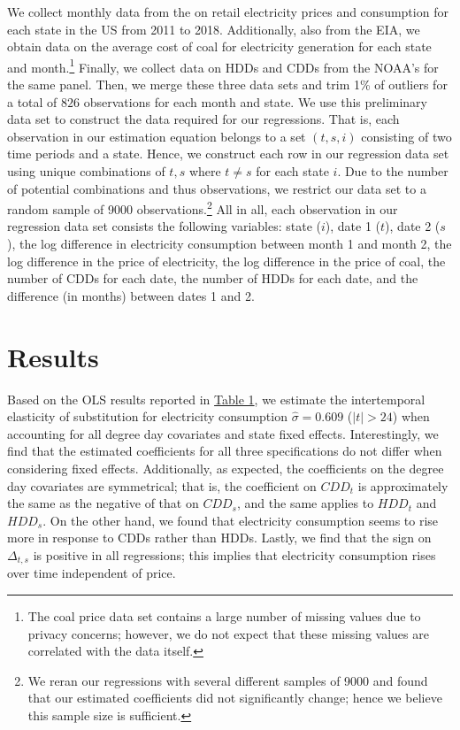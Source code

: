 \documentclass[11pt,a4paper]{extarticle}
\begin{document}
We collect monthly data from the \cite{EIANetgen} on retail electricity prices and consumption for each state in the US from 2011 to 2018. Additionally, also from the EIA, we obtain data on the average cost of coal for electricity generation for each state and month.\footnote{The coal price data set contains a large number of missing values due to privacy concerns; however, we do not expect that these missing values are correlated with the data itself.} 
Finally, we collect data on HDDs and CDDs from the NOAA's \citet{CPC} for the same panel. Then, we merge these three data sets and trim 1\% of outliers for a total of $826$ observations for each month and state. We use this preliminary data set to construct the data required for our regressions. That is, each observation in our estimation equation belongs to a set $(t,s,i)$ consisting of two time periods and a state. Hence, we construct each row in our regression data set using unique combinations of $t,s$ where $t \neq s$ for each state $i$. Due to the number of potential combinations and thus observations, we restrict our data set to a random sample of 9000 observations.\footnote{We reran our regressions with several different samples of 9000 and found that our estimated coefficients did not significantly change; hence we believe this sample size is sufficient.} 
All in all, each observation in our regression data set consists the following variables: state ($i$), date 1 ($t$), date 2 ($s$), the log difference in electricity consumption between month 1 and month 2, the log difference in the price of electricity, the log difference in the price of coal, the number of CDDs for each date, the number of HDDs for each date, and the difference (in months) between dates 1 and 2.  



\section{Results}

Based on the OLS results reported in \hyperref[table:1]{Table 1}, we estimate the intertemporal elasticity of substitution for electricity consumption $\hat{\sigma}  = 0.609$ ($|t| > 24$) when accounting for all degree day covariates and state fixed effects. Interestingly, we find that the estimated coefficients for all three specifications do not differ when considering fixed effects. Additionally, as expected, the coefficients on the degree day covariates are symmetrical; that is, the coefficient on $CDD_{t}$ is approximately the same as the negative of that on $CDD_{s}$, and the same applies to $HDD_{t}$ and $HDD_{s}$. On the other hand, we found that electricity consumption seems to rise more in response to CDDs rather than HDDs. Lastly, we find that the sign on $\Delta_{t,s}$ is positive in all regressions; this implies that electricity consumption rises over time independent of price. 
\end{document}
